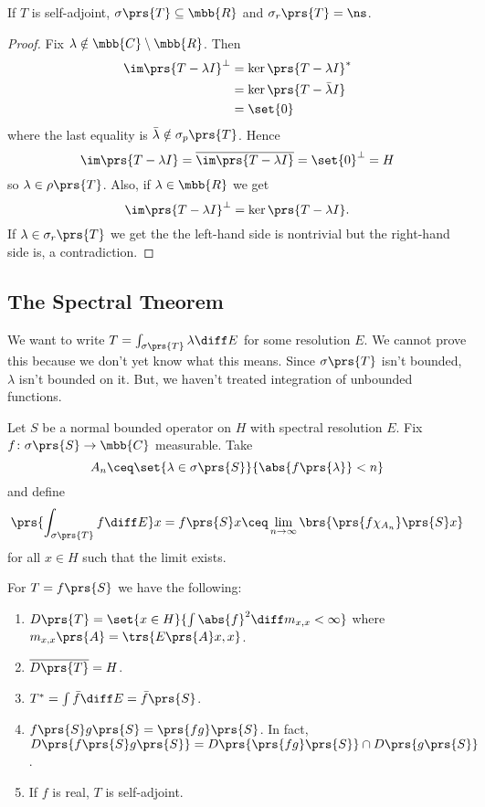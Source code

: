 \documentclass[10pt, twoside]{book}
\begin{document}
\begin{proposition}
If $T$ is self-adjoint, $\sigma\prs{T} \subseteq \mbb{R}$ and $\sigma_r\prs{T} = \ns$.
\end{proposition}

\begin{proof}
Fix $\lambda \notin \mbb{C} \setminus \mbb{R}$. Then
\begin{align*}
\im\prs{T - \lambda I}^\perp &= \ker\prs{T -\lambda I}^* \\&= \ker\prs{T - \bar{\lambda} I} \\&= \set{0}
\end{align*}
where the last equality is $\bar{\lambda} \notin \sigma_p\prs{T}$.
Hence \[\im\prs{T - \lambda I} = \overline{\im\prs{T - \lambda I}} = \set{0}^\perp = H\] so $\lambda \in \rho\prs{T}$.
Also, if $\lambda \in \mbb{R}$ we get \[\im\prs{T -\lambda I}^\perp = \ker\prs{T- \lambda I}\text{.}\] If $\lambda \in \sigma_r\prs{T}$ we get the the left-hand side is nontrivial but the right-hand side is, a contradiction.
\end{proof}

\subsection{The Spectral Tneorem}

We want to write $T = \int_{\sigma\prs{T}} \lambda \diff E$ for some resolution $E$. We cannot prove this because we don't yet know what this means. Since $\sigma\prs{T}$ isn't bounded, $\lambda$ isn't bounded on it. But, we haven't treated integration of unbounded functions.

\begin{definition}
Let $S$ be a normal bounded operator on $H$ with spectral resolution $E$. Fix $f \colon \sigma\prs{S} \to \mbb{C}$ measurable. Take
\[A_n \ceq \set{\lambda \in \sigma\prs{S}}{\abs{f\prs{\lambda}} < n}\]
and define
\[\prs{\int_{\sigma\prs{T}}f\diff E} x = f\prs{S}x \ceq \lim_{n \to \infty} \brs{\prs{f \chi_{A_n}}\prs{S} x}\]
for all $x \in H$ such that the limit exists.
\end{definition}

\begin{proposition}\label{proposition:unbounded_spectral_properties}
For $T = f\prs{S}$ we have the following:

\begin{enumerate}
\item $D\prs{T} = \set{x \in H}{\int \abs{f}^2 \diff m_{x,x} < \infty}$ where $m_{x,x}\prs{A} = \trs{E\prs{A}x,x}$.
\item $\overline{D\prs{T}} = H$.
\item $T^* = \int \bar{f} \diff E = \bar{f}\prs{S}$.
\item $f\prs{S} g\prs{S} = \prs{fg}\prs{S}$. In fact, $D\prs{f\prs{S} g\prs{S}} = D\prs{\prs{fg}\prs{S}} \cap D\prs{g\prs{S}}$.
\item If $f$ is real, $T$ is self-adjoint.
\end{enumerate}
\end{proposition}
\end{document}

